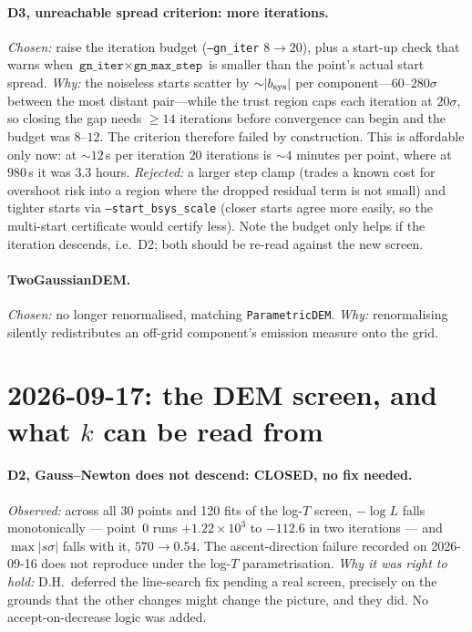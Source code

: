 \documentclass[11pt]{article}
\begin{document}
\paragraph{D3, unreachable spread criterion: more iterations.} \emph{Chosen:}
raise the iteration budget (\texttt{--gn\_iter} $8\to20$), plus a start-up
check that warns when $\texttt{gn\_iter}\times\texttt{gn\_max\_step}$ is smaller
than the point's actual start spread. \emph{Why:} the noiseless starts scatter
by ${\sim}|b_{\rm sys}|$ per component---$60$--$280\sigma$ between the most
distant pair---while the trust region caps each iteration at $20\sigma$, so
closing the gap needs $\ge14$ iterations before convergence can begin and the
budget was $8$--$12$. The criterion therefore failed by construction. This is
affordable only now: at ${\sim}12$\,s per iteration $20$ iterations is
${\sim}4$ minutes per point, where at $980$\,s it was $3.3$ hours.
\emph{Rejected:} a larger step clamp (trades a known cost for overshoot risk
into a region where the dropped residual term is not small) and tighter starts
via \texttt{--start\_bsys\_scale} (closer starts agree more easily, so the
multi-start certificate would certify less). Note the budget only helps if the
iteration descends, i.e.\ D2; both should be re-read against the new screen.

\paragraph{TwoGaussianDEM.} \emph{Chosen:} no longer renormalised, matching
\texttt{ParametricDEM}. \emph{Why:} renormalising silently redistributes an
off-grid component's emission measure onto the grid.

\section*{2026-09-17: the DEM screen, and what $k$ can be read from}

\paragraph{D2, Gauss--Newton does not descend: CLOSED, no fix needed.}
\emph{Observed:} across all 30 points and 120 fits of the log-$T$ screen,
$-\log L$ falls monotonically --- point~0 runs $+1.22\times10^3$ to $-112.6$ in
two iterations --- and $\max|s\sigma|$ falls with it, $570\to0.54$. The
ascent-direction failure recorded on 2026-09-16 does not reproduce under the
log-$T$ parametrisation. \emph{Why it was right to hold:} D.H.\ deferred the
line-search fix pending a real screen, precisely on the grounds that the other
changes might change the picture, and they did. No accept-on-decrease logic was
added.
\end{document}
